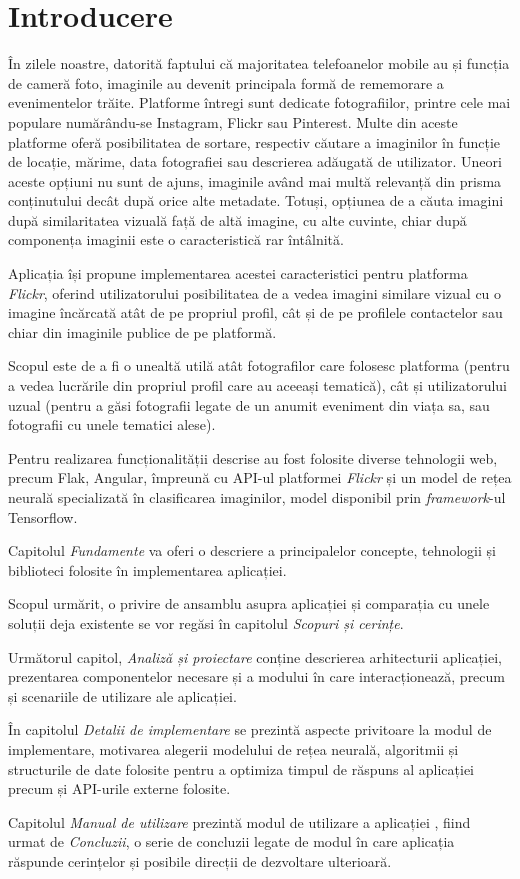 \chapter*{Introducere} 

În zilele noastre, datorită faptului că  majoritatea telefoanelor mobile au și funcția de cameră foto, imaginile au devenit principala formă de rememorare a evenimentelor trăite. Platforme întregi sunt dedicate fotografiilor, printre cele mai populare numărându-se Instagram, Flickr sau Pinterest. Multe din aceste platforme oferă posibilitatea de sortare, respectiv căutare a imaginilor în funcție de locație, mărime, data fotografiei sau descrierea adăugată de utilizator. Uneori aceste opțiuni nu sunt de ajuns, imaginile având mai multă relevanță din prisma conținutului decât după orice alte metadate. Totuși, opțiunea de a căuta imagini după similaritatea vizuală față de altă imagine, cu alte cuvinte, chiar după componența imaginii este o caracteristică rar întâlnită.

Aplicația {\applicationtitle} își propune implementarea acestei caracteristici \linebreak pentru platforma \textit{Flickr}, oferind utilizatorului posibilitatea de a vedea imagini similare vizual cu o imagine încărcată atât de pe propriul profil, cât și de pe profilele contactelor sau chiar din imaginile publice de pe platformă.

Scopul {\applicationtitle} este de a fi o unealtă utilă atât fotografilor care folosesc platforma (pentru a vedea lucrările din propriul profil care au aceeași tematică), cât și utilizatorului uzual (pentru a găsi fotografii legate de un anumit eveniment din viața sa, sau fotografii cu unele tematici alese).

Pentru realizarea funcționalității descrise au fost folosite diverse tehnologii web, precum Flak, Angular, împreună cu API-ul platformei \textit{Flickr} și un model de rețea neurală specializată în clasificarea imaginilor, model disponibil prin \textit{framework}-ul Tensorflow.

Capitolul \textit{Fundamente} va oferi o descriere a principalelor concepte, tehnologii și biblioteci folosite în implementarea aplicației. 

Scopul urmărit, o privire de ansamblu asupra aplicației și comparația cu unele soluții deja existente se vor regăsi în capitolul \textit{Scopuri și cerințe}.

Următorul capitol, \textit{Analiză și proiectare} conține descrierea arhitecturii aplicației, prezentarea componentelor necesare și a modului în care interacționează, precum și scenariile de utilizare ale aplicației.

În capitolul \textit{Detalii de implementare} se prezintă aspecte privitoare la modul de implementare, motivarea alegerii modelului de rețea neurală,  algoritmii și structurile de date folosite pentru a optimiza timpul de răspuns al aplicației precum și API-urile externe folosite.

Capitolul \textit{Manual de utilizare} prezintă modul de utilizare a aplicației
, fiind urmat de \textit{Concluzii}, o serie de concluzii legate de modul în care aplicația răspunde cerințelor și posibile direcții de dezvoltare ulterioară.
